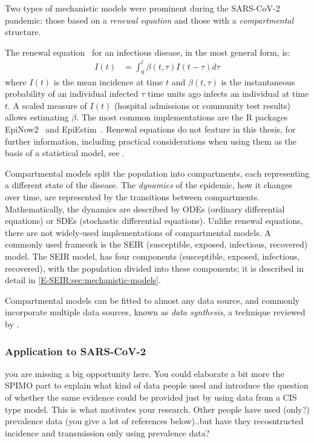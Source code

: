 \documentclass[thesis.tex]{subfiles}
\begin{document}
Two types of mechanistic models were prominent during the SARS-CoV-2 pandemic: those based on a \emph{renewal equation} and those with a \emph{compartmental} structure.

The renewal equation~\autocite{fraserRenewal} for an infectious disease, in the most general form, is:
\begin{align}
    I(t) &= \int_{0}^{t} \beta(t,\tau) I(t-\tau) d \tau
\end{align}
where $I(t)$ is the mean incidence at time $t$ and $\beta(t, \tau)$ is the instantaneous probability of an individual infected $\tau$ time units ago infects an individual at time $t$.
A scaled measure of $I(t)$ (\eg hospital admissions or community test results) allows estimating $\beta$.
The most common implementations are the R packages EpiNow2~\autocite{EpiNow2} and EpiEstim~\autocite{EpiEstim}.
Renewal equations do not feature in this thesis, for further information, including practical considerations when using them as the basis of a statistical model, see \textcite{nashEstimating,gosticPractical}.

Compartmental models split the population into compartments, each representing a different state of the disease.
The \emph{dynamics} of the epidemic, how it changes over time, are represented by the transitions between compartments.
Mathematically, the dynamics are described by ODEs (ordinary differential equations) or SDEs (stochastic differential equations).
Unlike renewal equations, there are not widely-used implementations of compartmental models.
A commonly used frameork is the SEIR (susceptible, exposed, infectious, recovered) model.
The SEIR model, has four components (susceptible, exposed, infectious, recovered), with the population divided into these components; it is described in detail in \cref{E-SEIR:sec:mechanistic-models}.

Compartmental models can be fitted to almost any data source, and commonly incorporate multiple data sources, known as \emph{data synthesis}, a technique reviewed by \textcite{birrellEvidence}.



\subsubsection{Application to SARS-CoV-2}
{\color{red} you are missing a big opportunity here. You could elaborate a bit more the SPIMO part to explain what kind of data people used and introduce the question of whether the same evidence could be provided just by using data from a CIS type model. This is what motivates your research. Other people have used (only?) prevalence data (you give a lot of references below)..but have they recosntructed incidence and transmission only using prevalence data?}
\end{document}
